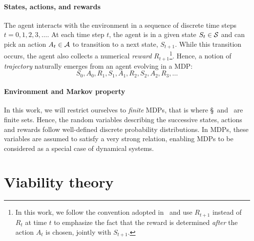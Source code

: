 			\paragraph{States, actions, and rewards}The agent interacts with the environment in a sequence of discrete time steps $t = 0, 1, 2, 3, \hdots$. At each time step $t$, the agent is in a given state $S_t \in \S$ and can pick an action $A_t \in \A$ to transition to a next state, $S_{t+1}$. While this transition occurs, the agent also collects a numerical \emph{reward} $R_{t+1}$\footnote{In this work, we follow the convention adopted in~\cite{sutton2018reinforcement} and use $R_{t+1}$ instead of $R_t$ at time $t$ to emphasize the fact that the reward is determined\emph{ after} the action $A_t$ is chosen, jointly with $S_{t+1}$.}. Hence, a notion of\emph{ trajectory} naturally emerges from an agent evolving in a MDP:
			\begin{equation*}
				S_0, A_0, R_1, S_1, A_1, R_2, S_2, A_2, R_3, \hdots
			\end{equation*}
			\paragraph{Environment and Markov property} In this work, we will restrict ourselves to\emph{ finite} MDPs, that is where \S~and \A~are finite sets. Hence, the random variables describing the successive states, actions and rewards follow well-defined discrete probability distributions. In MDPs, these variables are assumed to satisfy a very strong relation, enabling MDPs to be considered as a special case of dynamical systems. %
	
	\section{Viability theory} \label{sec:preliminary viability}